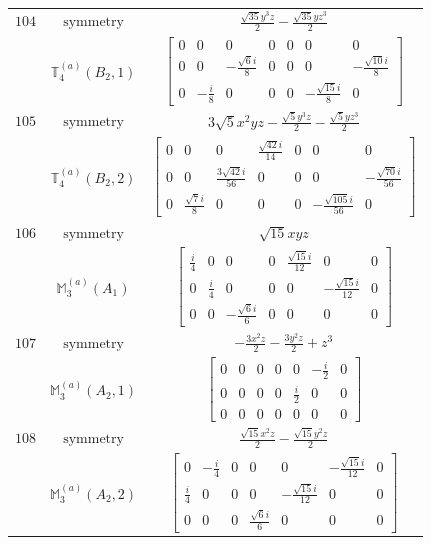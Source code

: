 \documentclass[fleqn,8pt,landscape]{jsarticle}
\begin{document}
\begin{longtable}{ccc}
$ 104 $ & $ \text{symmetry} $ & $ \frac{\sqrt{35} y^{3} z}{2} - \frac{\sqrt{35} y z^{3}}{2} $ \\
$  $ & $ \mathbb{T}_{4}^{(a)}(B_{2},1) $ & $ \begin{bmatrix} 0 & 0 & 0 & 0 & 0 & 0 & 0 \\ 0 & 0 & - \frac{\sqrt{6} i}{8} & 0 & 0 & 0 & - \frac{\sqrt{10} i}{8} \\ 0 & - \frac{i}{8} & 0 & 0 & 0 & - \frac{\sqrt{15} i}{8} & 0 \end{bmatrix} $ \\ \hline
$ 105 $ & $ \text{symmetry} $ & $ 3 \sqrt{5} x^{2} y z - \frac{\sqrt{5} y^{3} z}{2} - \frac{\sqrt{5} y z^{3}}{2} $ \\
$  $ & $ \mathbb{T}_{4}^{(a)}(B_{2},2) $ & $ \begin{bmatrix} 0 & 0 & 0 & \frac{\sqrt{42} i}{14} & 0 & 0 & 0 \\ 0 & 0 & \frac{3 \sqrt{42} i}{56} & 0 & 0 & 0 & - \frac{\sqrt{70} i}{56} \\ 0 & \frac{\sqrt{7} i}{8} & 0 & 0 & 0 & - \frac{\sqrt{105} i}{56} & 0 \end{bmatrix} $ \\ \hline
$ 106 $ & $ \text{symmetry} $ & $ \sqrt{15} x y z $ \\
$  $ & $ \mathbb{M}_{3}^{(a)}(A_{1}) $ & $ \begin{bmatrix} \frac{i}{4} & 0 & 0 & 0 & \frac{\sqrt{15} i}{12} & 0 & 0 \\ 0 & \frac{i}{4} & 0 & 0 & 0 & - \frac{\sqrt{15} i}{12} & 0 \\ 0 & 0 & - \frac{\sqrt{6} i}{6} & 0 & 0 & 0 & 0 \end{bmatrix} $ \\ \hline
$ 107 $ & $ \text{symmetry} $ & $ - \frac{3 x^{2} z}{2} - \frac{3 y^{2} z}{2} + z^{3} $ \\
$  $ & $ \mathbb{M}_{3}^{(a)}(A_{2},1) $ & $ \begin{bmatrix} 0 & 0 & 0 & 0 & 0 & - \frac{i}{2} & 0 \\ 0 & 0 & 0 & 0 & \frac{i}{2} & 0 & 0 \\ 0 & 0 & 0 & 0 & 0 & 0 & 0 \end{bmatrix} $ \\ \hline
$ 108 $ & $ \text{symmetry} $ & $ \frac{\sqrt{15} x^{2} z}{2} - \frac{\sqrt{15} y^{2} z}{2} $ \\
$  $ & $ \mathbb{M}_{3}^{(a)}(A_{2},2) $ & $ \begin{bmatrix} 0 & - \frac{i}{4} & 0 & 0 & 0 & - \frac{\sqrt{15} i}{12} & 0 \\ \frac{i}{4} & 0 & 0 & 0 & - \frac{\sqrt{15} i}{12} & 0 & 0 \\ 0 & 0 & 0 & \frac{\sqrt{6} i}{6} & 0 & 0 & 0 \end{bmatrix} $ \\ \hline

\end{longtable}
\end{document}
